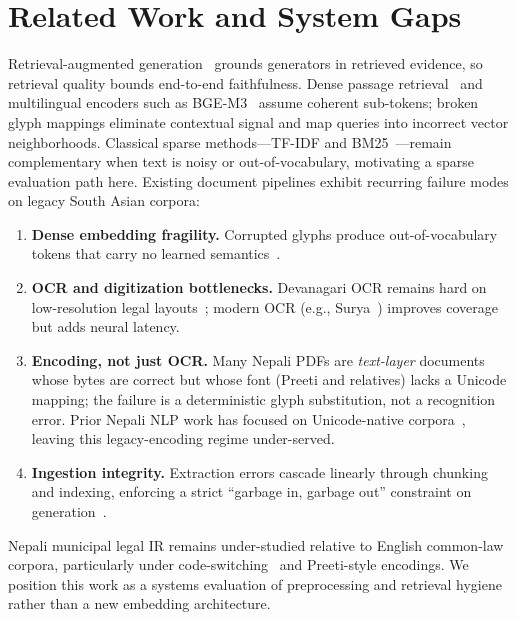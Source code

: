 \documentclass[conference]{IEEEtran}
\begin{document}
\section{Related Work and System Gaps}
Retrieval-augmented generation~\cite{lewis2020rag} grounds generators in retrieved evidence, so retrieval quality bounds end-to-end faithfulness. Dense passage retrieval~\cite{karpukhin2020dpr} and multilingual encoders such as BGE-M3~\cite{chen2024bge} assume coherent sub-tokens; broken glyph mappings eliminate contextual signal and map queries into incorrect vector neighborhoods. Classical sparse methods---TF-IDF and BM25~\cite{robertson2009bm25,manning2008ir}---remain complementary when text is noisy or out-of-vocabulary, motivating a sparse evaluation path here. Existing document pipelines exhibit recurring failure modes on legacy South Asian corpora:
\begin{enumerate}
  \item \textbf{Dense embedding fragility.} Corrupted glyphs produce out-of-vocabulary tokens that carry no learned semantics~\cite{chen2024bge,reimers2019sbert}.
  \item \textbf{OCR and digitization bottlenecks.} Devanagari OCR remains hard on low-resolution legal layouts~\cite{jayadevan2011devanagari}; modern OCR (e.g., Surya~\cite{surya2024}) improves coverage but adds neural latency.
  \item \textbf{Encoding, not just OCR.} Many Nepali PDFs are \emph{text-layer} documents whose bytes are correct but whose font (Preeti and relatives) lacks a Unicode mapping; the failure is a deterministic glyph substitution, not a recognition error. Prior Nepali NLP work has focused on Unicode-native corpora~\cite{nepberta2022}, leaving this legacy-encoding regime under-served.
  \item \textbf{Ingestion integrity.} Extraction errors cascade linearly through chunking and indexing, enforcing a strict ``garbage in, garbage out'' constraint on generation~\cite{langchain}.
\end{enumerate}
Nepali municipal legal IR remains under-studied relative to English common-law corpora, particularly under code-switching~\cite{sitaram2019codeswitch} and Preeti-style encodings. We position this work as a systems evaluation of preprocessing and retrieval hygiene rather than a new embedding architecture.
\end{document}
